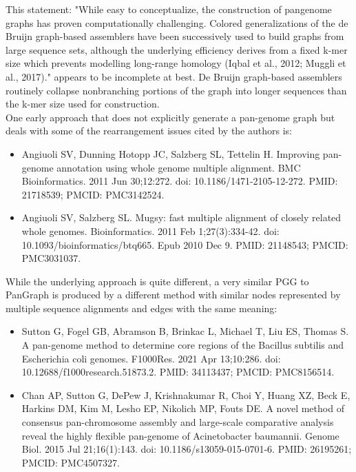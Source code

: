 \documentclass{article}
\begin{document}
This statement: "While easy to conceptualize, the construction of pangenome graphs has proven computationally challenging. Colored generalizations of the de Bruijn graph-based assemblers have been successively used to build graphs from large sequence sets, although the underlying efficiency derives from a fixed k-mer size which prevents modelling long-range homology (Iqbal et al., 2012; Muggli et al., 2017)." appears to be incomplete at best. De Bruijn graph-based assemblers routinely collapse nonbranching portions of the graph into longer sequences than the k-mer size used for construction.\\
One early approach that does not explicitly generate a pan-genome graph but deals with some of the rearrangement issues cited by the authors is:
\begin{itemize}
    \item Angiuoli SV, Dunning Hotopp JC, Salzberg SL, Tettelin H. Improving pan-genome annotation using whole genome multiple alignment. BMC Bioinformatics. 2011 Jun 30;12:272. doi: 10.1186/1471-2105-12-272. PMID: 21718539; PMCID: PMC3142524.
    \item Angiuoli SV, Salzberg SL. Mugsy: fast multiple alignment of closely related whole genomes. Bioinformatics. 2011 Feb 1;27(3):334-42. doi: 10.1093/bioinformatics/btq665. Epub 2010 Dec 9. PMID: 21148543; PMCID: PMC3031037.
\end{itemize}
While the underlying approach is quite different, a very similar PGG to PanGraph is produced by a different method with similar nodes represented by multiple sequence alignments and edges with the same meaning:
\begin{itemize}
    \item Sutton G, Fogel GB, Abramson B, Brinkac L, Michael T, Liu ES, Thomas S. A pan-genome method to determine core regions of the Bacillus subtilis and Escherichia coli genomes. F1000Res. 2021 Apr 13;10:286. doi: 10.12688/f1000research.51873.2. PMID: 34113437; PMCID: PMC8156514.
    \item Chan AP, Sutton G, DePew J, Krishnakumar R, Choi Y, Huang XZ, Beck E, Harkins DM, Kim M, Lesho EP, Nikolich MP, Fouts DE. A novel method of consensus pan-chromosome assembly and large-scale comparative analysis reveal the highly flexible pan-genome of Acinetobacter baumannii. Genome Biol. 2015 Jul 21;16(1):143. doi: 10.1186/s13059-015-0701-6. PMID: 26195261; PMCID: PMC4507327.
\end{itemize}
\end{document}

